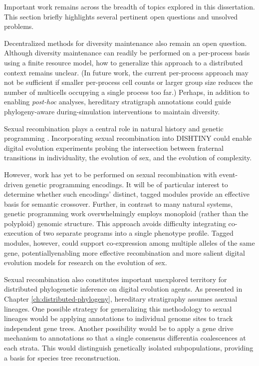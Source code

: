 Important work remains across the breadth of topics explored in this dissertation.
This section briefly highlights several pertinent open questions and unsolved problems.

Decentralized methods for diversity maintenance also remain an open question.
Although diversity maintenance can readily be performed on a per-process basis using a finite resource model, how to generalize this approach to a distributed context remains unclear.
(In future work, the current per-process approach may not be sufficient if smaller per-process cell counts or larger group size reduces the number of multicells occupying a single process too far.)
Perhaps, in addition to enabling \textit{post-hoc} analyses, hereditary stratigraph annotations could guide phylogeny-aware during-simulation interventions to maintain diversity.

Sexual recombination plays a central role in natural history \citep{smith1997major} and genetic programming \citep{o2009riccardo}.
Incorporating sexual recombination into DISHTINY could enable digital evolution experiments probing the intersection between fraternal transitions in individuality, the evolution of sex, and the evolution of complexity.

However, work has yet to be performed on sexual recombination with event-driven genetic programming encodings.
It will be of particular interest to determine whether such encodings’ distinct, tagged modules provide an effective basis for semantic crossover.
Further, in contrast to many natural systems, genetic programming work overwhelmingly employs monoploid (rather than the polyploid) genomic structure.
This approach avoids difficulty integrating co-execution of two separate programs into a single phenotype profile.
Tagged modules, however, could support co-expression among multiple alleles of the same gene, potentiallyenabling more effective recombination and more salient digital evolution models for research on the evolution of sex.

Sexual recombination also constitutes important unexplored territory for distributed phylogenetic inference on digital evolution agents.
As presented in Chapter \ref{ch:distributed-phylogeny}, hereditary stratigraphy assumes asexual lineages.
One possible strategy for generalizing this methodology to sexual lineages would be applying annotations to individual genome sites to track independent gene trees.
Another possibility would be to apply a gene drive mechanism to annotations so that a single consensus differentia coalescences at each strata.
This would distinguish genetically isolated subpopulations, providing a basis for species tree reconstruction.

